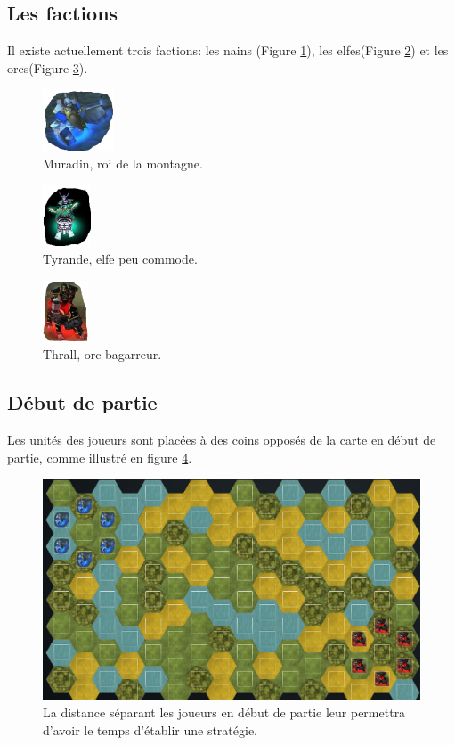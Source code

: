 	\subsection{Les factions}
		Il existe actuellement trois factions: les nains (Figure \ref{fig:dwarf}), les elfes(Figure \ref{fig:elf}) et les orcs(Figure \ref{fig:orc}).

		\begin{figure}[h!]
			\centering
			\includegraphics{figure/dwarf.png}
			\caption{Muradin, roi de la montagne.}
			\label{fig:dwarf}
		\end{figure}	
		\begin{figure}[h!]
			\centering
			\includegraphics{figure/elf.png}
			\caption{Tyrande, elfe peu commode.}
			\label{fig:elf}
		\end{figure}		
		\begin{figure}[h!]
			\centering
			\includegraphics{figure/orc.png}
			\caption{Thrall, orc bagarreur.}
			\label{fig:orc}
		\end{figure}		
	
	\subsection{Début de partie}
		Les unités des joueurs sont placées à des coins opposés de la carte en début de partie, comme illustré en figure \ref{fig:debut_partie}.

		\begin{figure}[h]
			\centering
			\includegraphics[width=1\textwidth]{figure/debut_partie.png}
			\caption{La distance séparant les joueurs en début de partie leur permettra d'avoir le temps d'établir une stratégie.}
			\label{fig:debut_partie}
		\end{figure}


